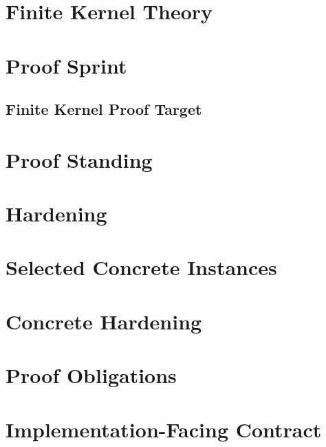 \documentclass[11pt,oneside,openany]{book}
\begin{document}
\frontmatter



\tableofcontents
\mainmatter
\part{Finite Kernel Theory}

\part{Proof Sprint}
\chapter{Finite Kernel Proof Target}


\part{Proof Standing}





\part{Hardening}



\part{Selected Concrete Instances}




\part{Concrete Hardening}

\part{Proof Obligations}

\part{Implementation-Facing Contract}
\end{document}
